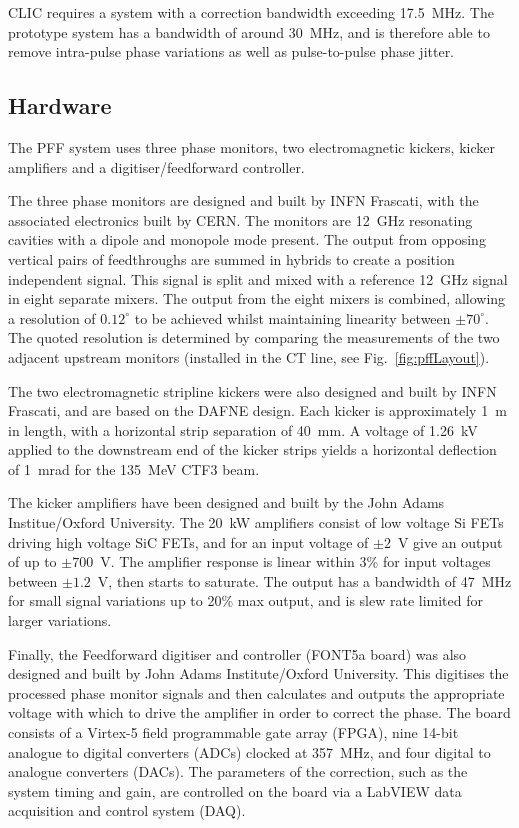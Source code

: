 \documentclass[%
 reprint,
 amsmath,amssymb,
 prl,
]{revtex4-1}
\begin{document}
CLIC requires a system with a correction 
bandwidth exceeding 17.5~MHz. The prototype system has a bandwidth of around 
30~MHz, and is therefore able to remove intra-pulse phase variations as well as 
pulse-to-pulse phase jitter.

\subsection{\label{ss:hardware}Hardware}

The PFF system uses three phase monitors, two electromagnetic kickers, kicker 
amplifiers and a digitiser/feedforward controller.

The three phase monitors are designed and built by INFN Frascati, with the 
associated electronics built by CERN. The monitors are 12~GHz resonating 
cavities with a dipole and monopole mode present. The output from opposing 
vertical pairs of feedthroughs are summed in hybrids to create a position 
independent signal. This signal is split and mixed with a reference 12~GHz 
signal in eight separate mixers. The output from the eight mixers is combined, 
allowing a resolution of \(0.12^\circ\) to be 
achieved whilst maintaining linearity between \(\pm70^\circ\). The quoted 
resolution 
is determined by 
comparing the measurements of the two adjacent upstream monitors (installed in 
the CT 
line, see Fig.~\ref{fig:pffLayout}).

The two electromagnetic stripline kickers were also designed and built by INFN 
Frascati,  
and are based on the DAFNE design. Each kicker is approximately 1~m in length, 
with a horizontal strip separation of 40~mm. A voltage of 1.26~kV applied to 
the 
downstream end of the kicker strips yields a horizontal deflection of 1~mrad 
for the 135~MeV CTF3 beam.

The kicker amplifiers have been designed and built by the John Adams 
Institue/Oxford University. The 20~kW amplifiers consist of low voltage Si FETs 
driving high voltage SiC FETs, and for 
an input voltage of \(\pm2\)~V give an output of up to \(\pm700\)~V. The 
amplifier response is linear within 
3\% for input voltages between \(\pm1.2\)~V, then starts to saturate. The 
output 
has a bandwidth of 47~MHz for small signal variations up to 20\% max output, 
and is slew rate limited for larger variations.

Finally, the Feedforward digitiser and controller (FONT5a board) was also 
designed and built by John Adams Institute/Oxford University. This digitises 
the 
processed phase monitor signals and then calculates and outputs the appropriate 
voltage with which to drive the amplifier in order to correct the phase. The 
board consists of a Virtex-5 field programmable gate array (FPGA), nine 14-bit 
analogue to digital converters (ADCs) clocked at 357~MHz, and four digital to 
analogue converters (DACs). The parameters of the correction, such as the 
system timing and gain, are controlled on the board via a LabVIEW data 
acquisition and control system (DAQ).
\end{document}
